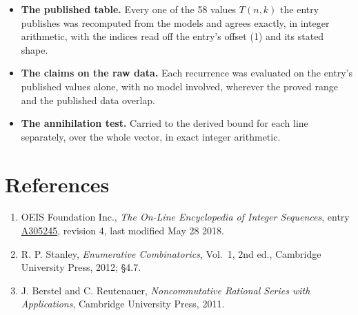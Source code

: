 \documentclass[11pt]{article}
\theoremstyle{definition}
\begin{document}
\begin{itemize}

\item {\bfseries The published table.} Every one of the 58 values $T(n,k)$ the entry publishes was recomputed from the models and agrees exactly, in integer arithmetic, with the indices read off the entry's offset (1) and its stated shape.

\item {\bfseries The claims on the raw data.} Each recurrence was evaluated on the entry's published values alone, with no model involved, wherever the proved range and the published data overlap.

\item {\bfseries The annihilation test.} Carried to the derived bound for each line separately, over the whole vector, in exact integer arithmetic.

\end{itemize}

\section{References}

\begin{enumerate}

\item OEIS Foundation Inc., \emph{The On-Line Encyclopedia of Integer Sequences}, entry \href{https://oeis.org/A305245}{A305245}, revision 4, last modified May 28 2018.

\item R. P. Stanley, \emph{Enumerative Combinatorics}, Vol.~1, 2nd ed., Cambridge University Press, 2012; \S4.7.

\item J. Berstel and C. Reutenauer, \emph{Noncommutative Rational Series with Applications}, Cambridge University Press, 2011.

\end{enumerate}
\end{document}
